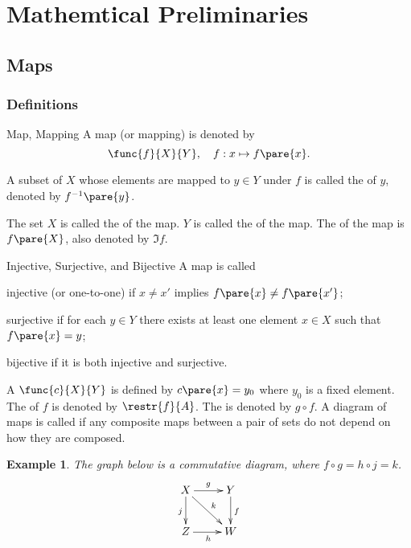 \documentclass[hidelinks]{article}
\newtheorem{example}{Example}
\providecommand{\comp}{\circ}
\begin{document}
\section{Mathemtical Preliminaries} %
\label{sec:mathemtical_preliminaries}

\subsection{Maps} %
\label{sub:maps}

\subsubsection{Definitions} %
\label{ssub:definitions}

\begin{termdef}{Map, Mapping}
    A map (or mapping) is denoted by
    \[ \func{f}{X}{Y}, \quad f:x\mapsto f\pare{x}. \]
\end{termdef}
A subset of $X$ whose elements are mapped to $y\in Y$ under $f$ is called the  of $y$, denoted by $f^{-1}\pare{y}$.
\par
The set $X$ is called the  of the map. $Y$ is called the  of the map. The  of the map is $f\pare{X}$, also denoted by $\Im f$.
\begin{termdef}[2\baselineskip]{Injective, Surjective, and Bijective}
    A map is called
    \begin{citemize}
        \item injective (or one-to-one) if $x\neq x'$ implies $f\pare{x} \neq f\pare{x'}$;
        \item surjective if for each $y\in Y$ there exists at least one element $x\in X$ such that $f\pare{x} = y$;
        \item bijective if it is both injective and surjective.
    \end{citemize}
\end{termdef}
A  $\func{c}{X}{Y}$ is defined by $c\pare{x} = y_0$ where $y_0$ is a fixed element. The  of $f$ is denoted by $\restr{f}{A}$. The  is denoted by $g\comp f$. A diagram of maps is called  if any composite maps between a pair of sets do not depend on how they are composed.
\begin{sample}
    \begin{example}
        The graph below is a commutative diagram, where $f\comp g = h\comp j = k$.
        \[ \xymatrix{
            X \ar[r]^g \ar[rd]^k \ar[d]_j & Y \ar[d]^f \\
            Z \ar[r]_h & W
        } \]
    \end{example}
\end{sample}
\end{document}
